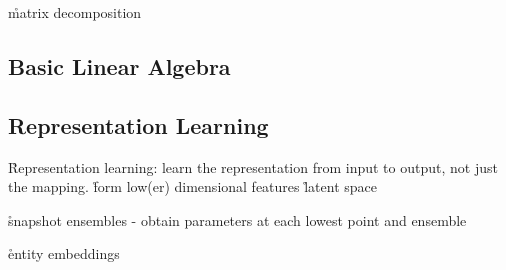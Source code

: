 \r{matrix decomposition}

\subsection{Basic Linear Algebra}


\subsection{Representation Learning}

\r{Representation learning: learn the representation from input to output, not just the mapping.}
\r{form low(er) dimensional features}
\r{latent space}



\r{snapshot ensembles \cite{huang2017snapshot} - obtain parameters at each lowest point and ensemble}


\r{entity embeddings \cite{guo2016entity}}

